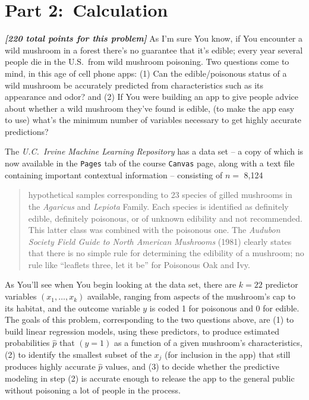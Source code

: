 \documentclass[12pt]{article}
\newcommand{\bi}[1]{\b{\i{#1}}}
\renewcommand{\b}[1]{\textbf{#1}}
\renewcommand{\i}[1]{\textit{#1}}
\begin{document}
\section*{Part 2:~Calculation}

\bi{[220 total points for this problem]} As I'm sure You know, if You encounter a wild mushroom in a forest there's no guarantee that it's edible; every year several people die in the U.S.~from wild mushroom poisoning. Two questions come to mind, in this age of cell phone apps: (1) Can the edible/poisonous status of a wild mushroom be accurately predicted from characteristics such as its appearance and odor? and (2) If You were building an app to give people advice about whether a wild mushroom they've found is edible, (to make the app easy to use) what's the minimum number of variables necessary to get highly accurate predictions?

The \textit{U.C.~Irvine Machine Learning Repository} has a data set -- a copy of which is now available in the \texttt{Pages} tab of the course \texttt{Canvas} page, along with a text file containing important contextual information -- consisting of $n =$ 8,124 

\begin{quote}

hypothetical samples corresponding to 23 species of gilled mushrooms in the \textit{Agaricus} and \textit{Lepiota} Family. Each species is identified as
definitely edible, definitely poisonous, or of unknown edibility and not recommended. This latter class was combined with the poisonous one. The \textit{Audubon Society Field Guide to North American Mushrooms} (1981) clearly states that there is no simple rule for determining the edibility of a mushroom; no rule like ``leaflets three, let it be'' for Poisonous Oak and Ivy.

\end{quote}

As You'll see when You begin looking at the data set, there are $k = 22$ predictor variables $( x_1, \dots, x_k )$ available, ranging from aspects of the mushroom's cap to its habitat, and the outcome variable $y$ is coded 1 for poisonous and 0 for edible. The goals of this problem, corresponding to the two questions above, are (1) to build linear regression models, using these predictors, to produce estimated probabilities $\hat{ p }$ that $( y = 1 )$ as a function of a given mushroom's characteristics, (2) to identify the smallest subset of the $x_j$ (for inclusion in the app) that still produces highly accurate $\hat{ p }$ values, and (3) to decide whether the predictive modeling in step (2) is accurate enough to release the app to the general public without poisoning a lot of people in the process.
\end{document}
